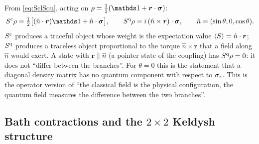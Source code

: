 \begin{exbox}
From \cref{eq:SclSqu}, acting on $\rho=\tfrac12(\Id+\bm r\cdot\bm\sigma)$:
\begin{equation}
  S^\cl\rho=\tfrac12\big[(\hat n\cdot\bm r)\Id+\hat n\cdot\bm\sigma\big],\qquad
  S^\qu\rho=i\,(\hat n\times\bm r)\cdot\bm\sigma,\qquad \hat n=(\sin\theta,0,\cos\theta).
\end{equation}
$S^{\mathrm{c}}$ produces a traceful object whose weight is the expectation value $\langle S\rangle=\hat n\cdot\bm r$; $S^{\mathrm{q}}$ produces a traceless object proportional to the torque $\hat n\times\bm r$ that a field along $\hat n$ would exert.
A state with $\bm r\parallel\hat n$ (a pointer state of the coupling) has $S^{\mathrm{q}}\rho=0$: it does not ``differ between the branches''.
For $\theta=0$ this is the statement that a diagonal density matrix has no quantum component with respect to $\sigma_z$.
This is the operator version of ``the classical field is the physical configuration, the quantum field measures the difference between the two branches''.
\end{exbox}

\subsection{Bath contractions and the \texorpdfstring{$2\times2$}{2x2} Keldysh structure}
\label{sec:contractions}

